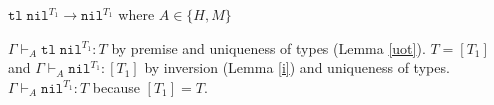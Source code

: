 \begin{case}
$\mathtt{tl}\;\mathtt{nil}^{T_{1}}\rightarrow\mathtt{nil}^{T_{1}}$ where $A\in\lbrace H,M\rbrace$

$\Gamma\vdash_{A}\mathtt{tl}\;\mathtt{nil}^{T_{1}}:T$ by premise and uniqueness of types (Lemma \ref{uot}).  $T=[T_{1}]$ and $\Gamma\vdash_{A}\mathtt{nil}^{T_{1}}:[T_{1}]$ by inversion (Lemma \ref{i}) and uniqueness of types.  $\Gamma\vdash_{A}\mathtt{nil}^{T_{1}}:T$ because $[T_{1}]=T$.
\end{case}